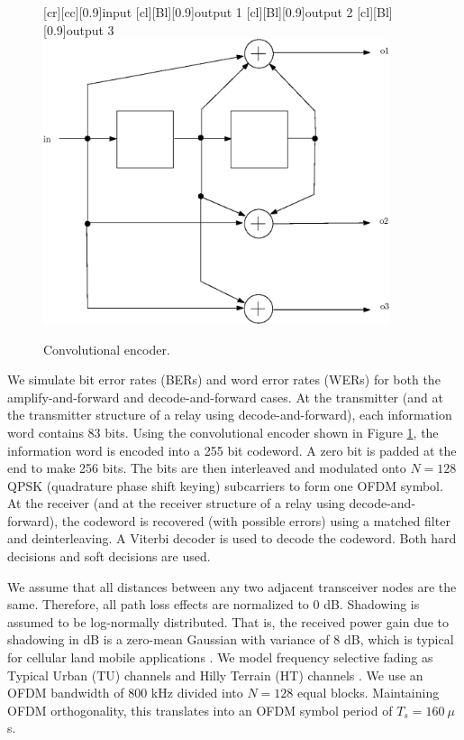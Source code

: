 \begin{figure}
  \centering
    [cr][cc][0.9]{input}
    [cl][Bl][0.9]{output 1}
    [cl][Bl][0.9]{output 2}
    [cl][Bl][0.9]{output 3}
    \includegraphics[width=4in]{conv_enc.eps}
   \caption{Convolutional encoder. \label{fig:conv_enc} }
\end{figure}

We simulate bit error rates (BERs) and word error rates (WERs) for both the amplify-and-forward and decode-and-forward cases.  At the transmitter (and at the transmitter structure of a relay using decode-and-forward), each information word contains 83 bits.  Using the convolutional encoder shown in Figure \ref{fig:conv_enc}, the information word is encoded into a 255 bit codeword.  A zero bit is padded at the end to make 256 bits.  The bits are then interleaved and modulated onto $N = 128$ QPSK (quadrature phase shift keying) subcarriers to form one OFDM symbol.  At the receiver (and at the receiver structure of a relay using decode-and-forward), the codeword is recovered (with possible errors) using a matched filter and deinterleaving.  A Viterbi decoder is used to decode the codeword.  Both hard decisions and soft decisions are used.

We assume that all distances between any two adjacent transceiver nodes are the same.  Therefore, all path loss effects are normalized to 0 dB.  Shadowing is assumed to be log-normally distributed.  That is, the received power gain due to shadowing in dB is a zero-mean Gaussian with variance of 8 dB, which is typical for cellular land mobile applications \cite{book:Stuber01}.  We model frequency selective fading as Typical Urban (TU) channels and Hilly Terrain (HT) channels \cite{book:Stuber01}.  We use an OFDM bandwidth of 800 kHz divided into $N = 128$ equal blocks.  Maintaining OFDM orthogonality, this translates into an OFDM symbol period of $T_s = 160 \:\mu$s.  

